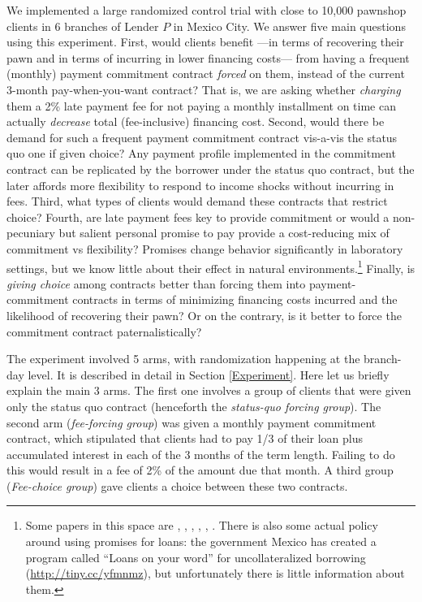 \documentclass[oneside,11pt]{article}
\begin{document}
We implemented a large randomized control trial with close to 10,000 pawnshop clients in 6 branches of Lender $P$ in Mexico City. We answer five main questions using this experiment. First, would clients benefit  ---in terms of recovering their pawn and in terms of incurring in lower financing costs---  from having a frequent (monthly) payment commitment contract \textit{forced} on them, instead of the current 3-month pay-when-you-want contract? That is, we are asking whether \textit{charging} them a 2\% late payment fee for not paying a monthly installment on time can actually \textit{decrease} total (fee-inclusive) financing cost. Second, would there be demand for such a frequent payment commitment contract vis-a-vis the status quo one if given choice? Any payment profile implemented in the commitment contract can be replicated by the borrower under the status quo contract, but the later affords more flexibility to respond to income shocks without incurring in fees. Third, what types of clients would demand these contracts that restrict choice? Fourth, are late payment fees key to provide commitment or would a non-pecuniary but salient personal promise to pay provide a cost-reducing mix of commitment vs flexibility? Promises change behavior significantly in laboratory settings, but we know little about their effect in natural environments.\footnote{Some papers in this space are \cite{PromisesPartnerships}, \cite{Vanberg}, \cite{Belot2010}, \cite{WhyDoPromises}, \cite{FurtherPromises}, \cite{Ismayilov2017}. There is also some actual policy around using promises for loans: the government Mexico has created a program called ``Loans on your word'' for uncollateralized borrowing (\url{http://tiny.cc/yfmnmz}), but unfortunately there is little information about them.} Finally, is \textit{giving choice} among contracts better than forcing them into payment-commitment contracts in terms of minimizing financing costs incurred and the likelihood of recovering their pawn? Or on the contrary, is it better to force the commitment contract 
paternalistically?

The experiment involved 5 arms, with randomization happening at the branch-day level. It is described in detail in Section \ref{Experiment}. Here let us briefly explain the main 3 arms. The first one involves a group of clients that were given only the status quo contract (henceforth the \textit{status-quo forcing group}). The second arm (\textit{fee-forcing group}) was given a monthly payment commitment contract, which stipulated that clients had to pay 1/3 of their loan plus accumulated interest in each of the 3 months of the term length. Failing to do this would result in a fee of 2\% of the amount due that month. A third group (\textit{Fee-choice group}) gave clients a choice between these two contracts. 
\end{document}
